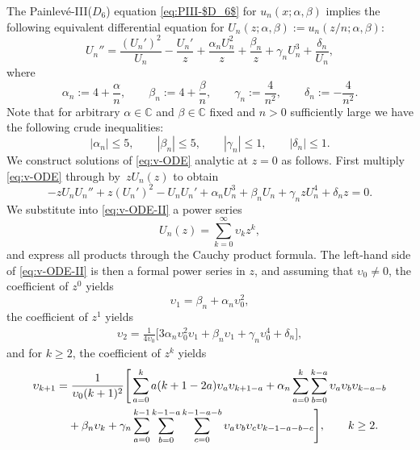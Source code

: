 \documentclass[pdftex]{sigma}
\numberwithin{equation}{section}
\begin{document}
The Painlev\'e-III($D_6$) equation \eqref{eq:PIII-$D_6$} for $u_n(x;\alpha, \beta)$ implies the following equivalent differential equation for $U_n(z;\alpha, \beta):=u_n(z/n;\alpha, \beta)$:
\begin{equation}
U_n''=\frac{(U_n')^2}{U_n}-\frac{U_n'}{z} +\frac{\alpha_nU_n^2}{z}+\frac{\beta_n}{z}+\gamma_nU_n^3+\frac{\delta_n}{U_n},
\label{eq:v-ODE}
\end{equation}
where
\begin{equation}
\alpha_n:=4+\frac{\alpha}{n},\qquad\beta_n:=4 + \frac{\beta}{n},\qquad\gamma_n:=\frac{4}{n^2},\qquad\delta_n:=-\frac{4}{n^2}.
\label{eq:$D_6$-parameters}
\end{equation}
Note that for arbitrary $\alpha\in\mathbb{C}$ and $\beta\in\mathbb{C}$ fixed and $n>0$ sufficiently large we have the following crude inequalities:
\begin{equation}
 |\alpha_n|\le 5,\qquad|\beta_n|\le 5,\qquad |\gamma_n|\le 1,\qquad |\delta_n|\le 1.
 \label{eq:$D_6$-parameters-inequalities}
\end{equation}
We construct solutions of \eqref{eq:v-ODE} analytic at $z=0$ as follows. First multiply \eqref{eq:v-ODE} through by~$zU_n(z)$ to obtain
\begin{equation}
 -zU_nU_n'' + z(U_n')^2-U_nU_n'+\alpha_nU_n^3+\beta_nU_n+\gamma_nzU_n^4 + \delta_nz=0.
 \label{eq:v-ODE-II}
\end{equation}
We substitute into \eqref{eq:v-ODE-II} a power series
\begin{equation}
U_n(z)=\sum_{k=0}^\infty \upsilon_kz^k,
\label{eq:v-series}
\end{equation}
and express all products through the Cauchy product formula. The left-hand side of \eqref{eq:v-ODE-II} is then a formal power series in $z$, and assuming that $\upsilon_0\neq 0$, the coefficient of $z^0$ yields
\begin{equation}
\upsilon_1=\beta_n+\alpha_n\upsilon_0^2,
\label{eq:c1-exact}
\end{equation}
the coefficient of $z^1$ yields
\begin{gather}
 \upsilon_2 = \frac{1}{4\upsilon_0}\big[3\alpha_n\upsilon_0^2\upsilon_1+\beta_n\upsilon_1+\gamma_n\upsilon_0^4 + \delta_n\big],
\end{gather}
and for $k\ge 2$, the coefficient of $z^k$ yields
\begin{align}
 & \upsilon_{k+1}= \frac{1}{\upsilon_0(k+1)^2}\Bigg[\sum_{a=0}^ka(k+1-2a)\upsilon_a\upsilon_{k+1-a} +
 \alpha_n\sum_{a=0}^{k}\sum_{b=0}^{k-a}\upsilon_a\upsilon_b \upsilon_{k-a-b}\nonumber\\
&\hphantom{\upsilon_{k+1}=}{}
+\beta_n\upsilon_k +
 \gamma_n\sum_{a=0}^{k-1}\sum_{b=0}^{k-1-a}\sum_{c=0}^{k-1-a-b}\upsilon_a\upsilon_b \upsilon_c \upsilon_{k-1-a-b-c}\Bigg],\qquad k\ge 2.
 \label{eq:xi-general-exact}
\end{align}
\end{document}
